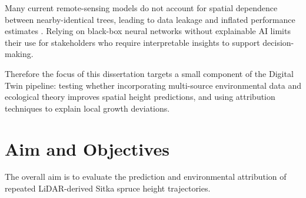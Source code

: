 \documentclass[11pt,a4paper]{report}
\begin{document}
Many current remote-sensing models do not account for spatial dependence between nearby-identical trees, leading to data leakage and inflated performance estimates \cite{Karasiak2022Spatial_C5_EVAL, ploton2020Spatial_C5_EVAL, lynch2025Digital_C4_NN}. Relying on black-box neural networks without explainable AI limits their use for stakeholders who require interpretable insights to support decision-making.

Therefore the focus of this dissertation targets a small component of the Digital Twin pipeline: testing whether incorporating multi-source environmental data and ecological theory improves spatial height predictions, and using attribution techniques to explain local growth deviations.


\section{Aim and Objectives}
The overall aim is to evaluate the prediction and environmental attribution of repeated LiDAR-derived Sitka spruce height trajectories.
\end{document}
